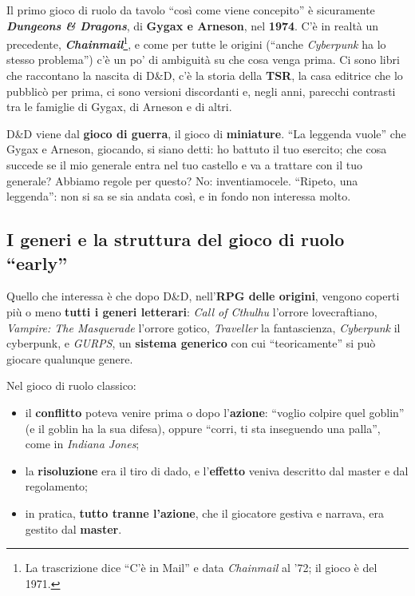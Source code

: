 Il primo gioco di ruolo da tavolo ``così come viene concepito'' è sicuramente
\textbf{\emph{Dungeons \& Dragons}}, di \textbf{Gygax e Arneson}, nel
\textbf{1974}. C'è in realtà un precedente, \textbf{\emph{Chainmail}}\footnote{La
trascrizione dice ``C'è in Mail'' e data \emph{Chainmail} al '72; il gioco è
del 1971.}, e come per tutte le origini (``anche \emph{Cyberpunk} ha lo stesso
problema'') c'è un po' di ambiguità su che cosa venga prima. Ci sono libri che
raccontano la nascita di D\&D, c'è la storia della \textbf{TSR}, la casa
editrice che lo pubblicò per prima, ci sono versioni discordanti e, negli anni,
parecchi contrasti tra le famiglie di Gygax, di Arneson e di altri.

D\&D viene dal \textbf{gioco di guerra}, il gioco di \textbf{miniature}. ``La
leggenda vuole'' che Gygax e Arneson, giocando, si siano detti: ho battuto il
tuo esercito; che cosa succede se il mio generale entra nel tuo castello e va a
trattare con il tuo generale? Abbiamo regole per questo? No: inventiamocele.
``Ripeto, una leggenda'': non si sa se sia andata così, e in fondo non interessa
molto.

\subsection{I generi e la struttura del gioco di ruolo ``early''}



Quello che interessa è che dopo D\&D, nell'\textbf{RPG delle origini}, vengono
coperti più o meno \textbf{tutti i generi letterari}: \emph{Call of Cthulhu}
l'orrore lovecraftiano, \emph{Vampire: The Masquerade} l'orrore gotico,
\emph{Traveller} la fantascienza, \emph{Cyberpunk} il cyberpunk, e \emph{GURPS},
un \textbf{sistema generico} con cui ``teoricamente'' si può giocare qualunque
genere.

Nel gioco di ruolo classico:
\begin{itemize}
  \item il \textbf{conflitto} poteva venire prima o dopo l'\textbf{azione}:
        ``voglio colpire quel goblin'' (e il goblin ha la sua difesa), oppure
        ``corri, ti sta inseguendo una palla'', come in \emph{Indiana Jones};
  \item la \textbf{risoluzione} era il tiro di dado, e l'\textbf{effetto} veniva
        descritto dal master e dal regolamento;
  \item in pratica, \textbf{tutto tranne l'azione}, che il giocatore gestiva e
        narrava, era gestito dal \textbf{master}.
\end{itemize}

